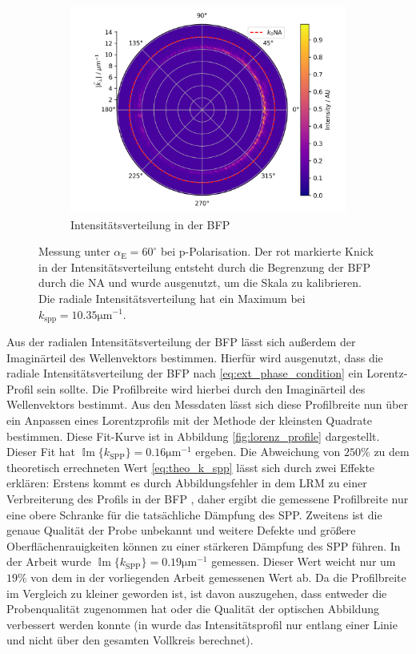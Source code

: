 \documentclass[titlepage]{article}
\renewcommand{\Im}{\operatorname{\mathbb{I}m}}
\begin{document}
\begin{figure}
\begin{subfigure}[b]{0.7\textwidth}
			\centering
			\includegraphics[width=\textwidth]{figures/example_polar.png}
			\caption{Intensitätsverteilung in der BFP}
			\label{fig:example_bfp}		
		\end{subfigure}
		\caption[Messwerte bei linearer Polarisation]{Messung unter $\alpha_{\mathrm{E}} = 60^\circ$ bei p-Polarisation.
			Der rot markierte Knick in der Intensitätsverteilung entsteht durch die Begrenzung der BFP durch die NA und wurde ausgenutzt, um die Skala zu kalibrieren. Die radiale Intensitätsverteilung hat ein Maximum bei $k_{\mathrm{spp}}= 10.35 \mathrm{\mu m ^{-1}}$.}			
	\end{figure}
	Aus der radialen Intensitätsverteilung der BFP lässt sich außerdem der Imaginärteil des Wellenvektors bestimmen. Hierfür  wird ausgenutzt, dass die radiale Intensitätsverteilung der BFP nach \eqref{eq:ext_phase_condition} ein Lorentz-Profil sein sollte. Die Profilbreite wird hierbei durch den Imaginärteil des Wellenvektors bestimmt. Aus den Messdaten lässt sich diese Profilbreite nun über ein Anpassen eines Lorentzprofils mit der Methode der kleinsten Quadrate bestimmen. Diese Fit-Kurve ist in Abbildung \ref{fig:lorenz_profile} dargestellt. Dieser Fit hat $\Im\{k_\mathrm{SPP}\} = 0.16 \mathrm{\mu m}^{-1}$ ergeben. Die Abweichung von $250\%$ zu dem theoretisch errechneten Wert \ref{eq:theo_k_spp} lässt sich durch zwei Effekte erklären: Erstens kommt es durch Abbildungsfehler in dem LRM zu einer Verbreiterung des Profils in der BFP \cite{Jaruschewski.2020}, daher ergibt die gemessene Profilbreite nur eine obere Schranke für die tatsächliche Dämpfung des SPP. Zweitens ist die genaue Qualität der Probe unbekannt und weitere Defekte und größere Oberflächenrauigkeiten können zu einer stärkeren Dämpfung des SPP führen. In der Arbeit \cite{Jaruschewski.2020} wurde  $\Im\{k_\mathrm{SPP}\} = 0.19 \mathrm{\mu m}^{-1}$ gemessen. Dieser Wert weicht nur um $19\%$ von dem in der vorliegenden Arbeit gemessenen Wert ab. Da die Profilbreite im Vergleich zu \cite{Jaruschewski.2020} kleiner geworden ist, ist davon auszugehen, dass entweder die Probenqualität zugenommen hat oder die Qualität der optischen Abbildung verbessert werden konnte (in \cite{Jaruschewski.2020} wurde das Intensitätsprofil nur entlang einer Linie und nicht über den gesamten Vollkreis berechnet).
	
\end{document}
